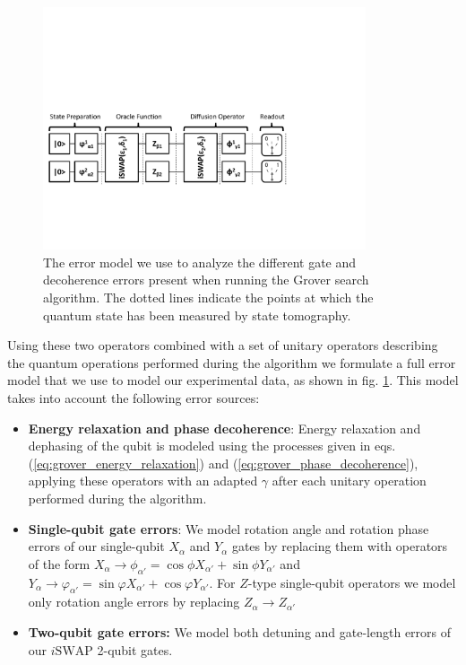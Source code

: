 \begin{figure}[ht!]
	\centering
		\includegraphics[width=0.85\textwidth]{"./material/papers/grover/grover_error_model"}
	\caption[Error model used for analyzing gate and decoherence errors for the Grover search algorithm]{The error model we use to analyze the different gate and decoherence errors present when running the Grover search algorithm. The dotted lines indicate the points at which the quantum state has been measured by state tomography.}
	\label{fig:GroverErrorModel}
\end{figure}


Using these two operators combined with a set of unitary operators describing the quantum operations performed during the algorithm we formulate a full error model that we use to model our experimental data, as shown in fig. \ref{fig:GroverErrorModel}. This model takes into account the following error sources:

\begin{itemize}
 \item {\bf Energy relaxation and phase decoherence}: Energy relaxation and dephasing of the qubit is modeled using the processes given in eqs. (\ref{eq:grover_energy_relaxation}) and (\ref{eq:grover_phase_decoherence}), applying these operators with an adapted $\gamma$ after each unitary operation performed during the algorithm.
 \item {\bf Single-qubit gate errors}: We model rotation angle and rotation phase errors of our single-qubit $X_\alpha$ and $Y_\alpha$ gates by replacing them with operators of the form $X_\alpha\to \phi_{\alpha'} = \cos{\phi}X_{\alpha'}+\sin{\phi}Y_{\alpha'}$ and $Y_\alpha \to \varphi_{\alpha'} = \sin{\varphi}X_{\alpha'}+\cos{\varphi}Y_{\alpha'}$. For $Z$-type single-qubit operators we model only rotation angle errors by replacing $Z_\alpha \to Z_{\alpha'}$ 
 \item {\bf Two-qubit gate errors:} We model both detuning and gate-length errors of our $i\mathrm{SWAP}$ 2-qubit gates.
\end{itemize}

